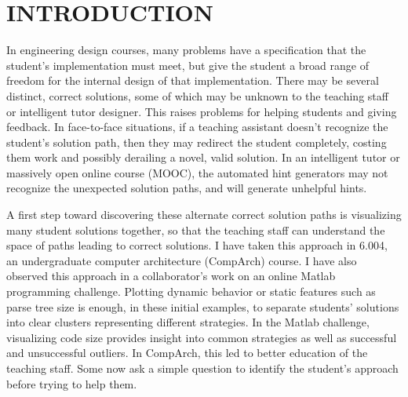 \documentclass[12pt]{article}
\begin{document}
\section{INTRODUCTION}


In engineering design courses, many problems have a specification that the student's implementation must meet, but give the student a broad range of freedom for the internal design of that implementation. There may be several distinct, correct solutions, some of which may be unknown to the teaching staff or intelligent tutor designer. This raises problems for helping students and giving feedback. In face-to-face situations, if a teaching assistant doesn't recognize the student's solution path, then they may redirect the student completely, costing them work and possibly derailing a novel, valid solution.  In an intelligent tutor or massively open online course (MOOC), the automated hint generators may not recognize the unexpected solution paths, and will generate unhelpful hints.

A first step toward discovering these alternate correct solution paths is visualizing many student solutions together, so that the teaching staff can understand the space of paths leading to correct solutions. I have taken this approach in 6.004, an undergraduate computer architecture (CompArch) course. I have also observed this approach in a collaborator's work on an online Matlab programming challenge. Plotting dynamic behavior or static features such as parse tree size is enough, in these initial examples, to separate students' solutions into clear clusters representing different strategies. In the Matlab challenge, visualizing code size provides insight into common strategies as well as successful and unsuccessful outliers. In CompArch, this led to better education of the teaching staff. Some now ask a simple question to identify the student's approach before trying to help them.
\end{document}
